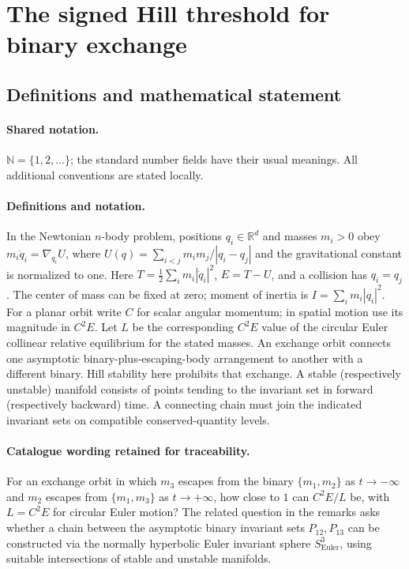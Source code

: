 \documentclass[11pt]{article}
\begin{document}
\section{The signed Hill threshold for binary exchange}\label{statement}

\subsection{Definitions and mathematical statement}

\paragraph{Shared notation.}$\mathbb N=\{1,2,\ldots\}$; the standard number fields have their usual meanings. All additional conventions are stated locally.


\paragraph{Definitions and notation.}In the Newtonian $n$-body problem, positions $q_i\in\mathbb R^d$ and masses $m_i>0$ obey $m_i\ddot q_i=\nabla_{q_i}U$, where $U(q)=\sum_{i<j}m_im_j/|q_i-q_j|$ and the gravitational constant is normalized to one. Here $T=\tfrac12\sum_i m_i|\dot q_i|^2$, $E=T-U$, and a collision has $q_i=q_j$. The center of mass can be fixed at zero; moment of inertia is $I=\sum_i m_i|q_i|^2$. For a planar orbit write $C$ for scalar angular momentum; in spatial motion use its magnitude in $C^2E$. Let $L$ be the corresponding $C^2E$ value of the circular Euler collinear relative equilibrium for the stated masses. An exchange orbit connects one asymptotic binary-plus-escaping-body arrangement to another with a different binary. Hill stability here prohibits that exchange. A stable (respectively unstable) manifold consists of points tending to the invariant set in forward (respectively backward) time. A connecting chain must join the indicated invariant sets on compatible conserved-quantity levels.

\paragraph{Catalogue wording retained for traceability.}
For an exchange orbit in which $m_3$ escapes from the binary $\{m_1,m_2\}$ as $t\to-\infty$ and $m_2$ escapes from $\{m_1,m_3\}$ as $t\to+\infty$, how close to $1$ can $C^2E/L$ be, with $L=C^2E$ for circular Euler motion? The related question in the remarks asks whether a chain between the asymptotic binary invariant sets $P_{12},P_{13}$ can be constructed via the normally hyperbolic Euler invariant sphere $S^3_{\mathrm{Euler}}$, using suitable intersections of stable and unstable manifolds.
\end{document}
